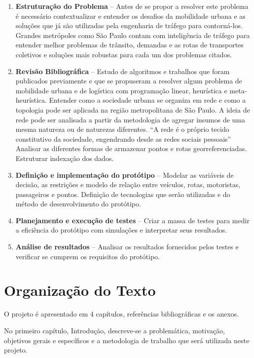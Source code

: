 \begin{enumerate}
\item \textbf{Estruturação do Problema} --
Antes de se propor a resolver este problema é necessário contextualizar e entender os desafios da mobilidade urbana e as soluções que já são utilizadas pela engenharia de tráfego para contorná-los. Grandes metrópoles como São Paulo contam com inteligência de tráfego para entender melhor problemas de trânsito, demandas e as rotas de transportes coletivos e soluções mais robustas para cada um dos problemas citados.  


\item \textbf{Revisão Bibliográfica} --
Estudo de algoritmos e trabalhos que foram publicados previamente e que se propuseram a resolver algum problema de mobilidade urbana e de logística com programação linear, heurística e meta-heurística. 
Entender como a sociedade urbana se organiza em rede e como a topologia pode ser aplicada na região metropolitana de São Paulo.  A ideia de rede pode ser analisada a partir da metodologia de agregar insumos de uma mesma natureza ou de naturezas diferentes. ``A rede é o próprio tecido constitutivo da sociedade, engendrando desde as redes sociais pessoais'' \cite{inojosa}
Analisar as diferentes formas de armazenar pontos e rotas georreferenciadas. Estruturar indexação dos dados.

\item \textbf{Definição e implementação do protótipo} --
Modelar as variáveis de decisão, as restrições e modelo de relação entre veículos, rotas, motoristas, passageiros e pontos. Definição de tecnologias que serão utilizadas e do método de desenvolvimento do protótipo.

\item \textbf{Planejamento e execução de testes} --
Criar a massa de testes para medir a eficiência do protótipo com simulações e interpretar seus resultados.

\item \textbf{Análise de resultados} -- 
Analisar os resultados fornecidos pelos testes e verificar se cumprem os requisitos do protótipo.
\end{enumerate}

\section{Organização do Texto}
O projeto é apresentado em 4 capítulos, referências bibliográficas e os anexos.

No primeiro capítulo, Introdução, descreve-se a problemática, motivação, objetivos gerais e específicos e a metodologia de trabalho que será utilizada neste projeto. 

